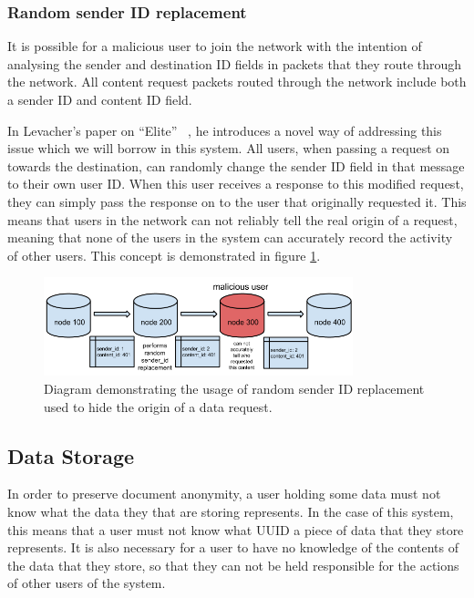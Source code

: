 \subsubsection{Random sender ID replacement}


It is possible for a malicious user to join the network with the intention of analysing the
sender and destination ID fields in packets that they route through the network. All content request
packets routed through the network include both a sender ID and content ID field.

In Levacher's paper on ``Elite'' ~\cite{levacher}, he introduces a novel way of addressing this issue which we will borrow
in this system.
All users, when passing a request on towards the destination, can randomly change the sender ID field in that message
to their own user ID. When this user receives a response to this modified request, they can simply pass the response
on to the user that originally requested it. This means that users in the network can not reliably tell
the real origin of a request, meaning that none of the users in the system can accurately record the activity of other users.
This concept is demonstrated in figure \ref{fig:sender_id}.

\begin{figure}[H]
    \centering
    \includegraphics[width=0.8\textwidth]{img/sender_id.png}
    \caption{Diagram demonstrating the usage of random sender ID replacement used to hide the origin of a data request.}
    \label{fig:sender_id}
\end{figure}


\subsection{Data Storage}


In order to preserve document anonymity, a user holding some data must not know what the data they that are storing represents.
In the case of this system, this means that a user must not know what UUID a piece of data that they store represents.
It is also necessary for a user to have no knowledge of the contents of the data that they store, so that they can not be held
responsible for the actions of other users of the system.

